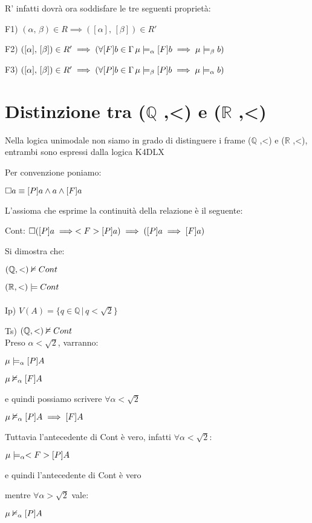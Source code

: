 R' infatti dovrà ora soddisfare le tre seguenti proprietà:

F1) $(\alpha,\,\beta)\in R\implies([\alpha],\,[\beta])\in R'$

F2) $([\alpha],\,[\beta])\in R'\implies(\forall[F]b\in\Gamma\,\mu\models_{\alpha}[F]b\implies\mu\models_{\beta}b)$

F3) $([\alpha],\,[\beta])\in R'\implies(\forall[P]b\in\Gamma\,\mu\models_{\beta}[P]b\implies\mu\models_{\alpha}b)$


\section{Distinzione tra ($\mathbb{Q}$ ,<) e ($\mathbb{R}$ ,<)}

Nella logica unimodale non siamo in grado di distinguere i frame ($\mathbb{Q}$
,<) e ($\mathbb{R}$ ,<), entrambi sono espressi dalla logica K4DLX

Per convenzione poniamo:

$\square a\equiv[P]a\wedge a\wedge[F]a$

L'assioma che esprime la continuità della relazione è il seguente:

Cont: $\square([P]a\implies<F>[P]a)\implies([P]a\implies[F]a)$

Si dimostra che:

$(\mathbb{Q},<)\nvDash Cont$

$(\mathbb{R},<)\models Cont$\\
\\
Ip) $V(A)=\{q\in\mathbb{Q}\,|\, q<\sqrt{2}\}$

Ts) $(\mathbb{Q},<)\nvDash Cont$\\


Preso $\alpha<\sqrt{2}$, varranno:

$\mu\models_{\alpha}[P]A$

$\mu\nvDash_{\alpha}[F]A$

e quindi possiamo scrivere $\forall\alpha<\sqrt{2}$

$\mu\nvDash_{\alpha}[P]A\implies[F]A$

Tuttavia l'antecedente di Cont è vero, infatti $\forall\alpha<\sqrt{2}$:

$\mu\models_{\alpha}<F>[P]A$ 

e quindi l'antecedente di Cont è vero

mentre $\forall\alpha>\sqrt{2}$ vale:

$\mu\nvDash_{\alpha}[P]A$

